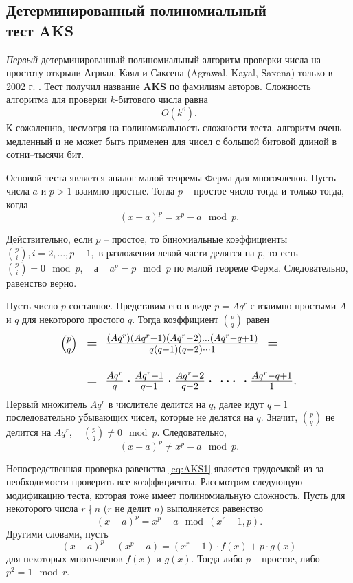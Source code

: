 \subsection[Детерминированный тест AKS]{Детерминированный полиномиальный \protect\\ тест AKS}

\emph{Первый} детерминированный полиномиальный алгоритм проверки числа на простоту открыли Агрвал, Каял и Саксена (Agrawal, Kayal, Saxena) только в 2002 г. . Тест получил название \textbf{AKS} по фамилиям авторов. Сложность алгоритма для проверки $k$-битового числа равна
    \[ O(k^{6}). \]
К сожалению, несмотря на полиномиальность сложности теста, алгоритм очень медленный и не может быть применен для чисел с большой битовой длиной в сотни--тысячи бит.

Основой теста является аналог малой теоремы Ферма для многочленов. Пусть числа $a$ и $p > 1$  взаимно простые. Тогда $p$ -- простое число тогда и только тогда, когда
\begin{equation}
    \label{eq:AKS1}
    (x - a)^p = x^p - a \mod p.
\end{equation}

Действительно, если $p$ -- простое, то биномиальные коэффициенты $\binom{p}{i}, i = 2,  \dots,  p-1,$ в разложении левой части делятся на $p$, то есть ~ $\binom{p}{i} = 0 \mod p$, ~ а ~ $a^p = p \mod p$ по малой теореме Ферма. Следовательно, равенство верно.

Пусть число $p$  составное. Представим его в виде $p = A q^r$ с взаимно простыми $A$ и $q$ для некоторого простого $q$. Тогда коэффициент $\binom{p}{q}$ равен
\[\Large \begin{array}{rl}
    \binom{p}{q} & =~ \frac{(A q^r) (A q^r - 1)(A q^r - 2) \dots (A q^r - q + 1)}{q (q-1)(q-2) \cdots 1} ~= \\
    & \\
    & =~ \frac{A q^r}{q} \cdot \frac{A q^r - 1}{q-1} \cdot \frac{A q^r - 2}{q-2} \cdot ~\cdots~ \cdot \frac{A q^r - q + 1}{1}. \\
\end{array} \]
Первый множитель $A q^r$ в числителе делится на $q$, далее идут $q-1$ последовательно убывающих чисел, которые не делятся на $q$. Значит, $\binom{p}{q}$ не делится на $A q^r$, ~ $\binom{p}{q} \neq 0 \mod p$. Следовательно,
\[
(x - a)^p \neq x^p - a \mod p.
\]

Непосредственная проверка равенства \eqref{eq:AKS1} является  трудоемкой  из-за необходимости проверить все коэффициенты. Рассмотрим следующую модификацию теста, которая тоже имеет полиномиальную сложность. Пусть для некоторого числа $r \nmid n$ ($r$ не делит $n$) выполняется равенство
\begin{equation}
    \label{eq:AKS2}
    (x - a)^p = x^p - a \mod (x^r-1, p).
\end{equation}
Другими словами, пусть
    \[ (x - a)^p - (x^p - a) = (x^r-1) \cdot f(x) + p \cdot g(x) \]
для некоторых многочленов $f(x)$ и $g(x)$. Тогда либо $p$ -- простое, либо $p^2 = 1 \mod r$.

